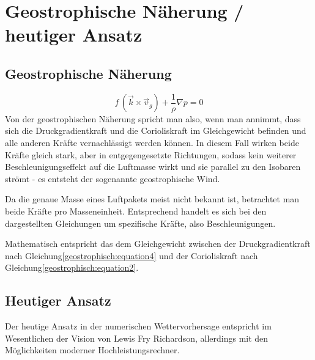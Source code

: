 %
%
%
%
\section{Geostrophische Näherung / heutiger Ansatz
\label{geostrophisch:section:geoNäherung}}
\subsection{Geostrophische Näherung}
\begin{equation}
f\, (\vec{k} \times \vec{v}_g) 
+
\frac{1}{\rho} \nabla p
=
0
\label{geostrophisch:equation5}
\end{equation}
Von der geostrophischen Näherung spricht man also, wenn man annimmt, dass sich die Druckgradientkraft und die Corioliskraft im Gleichgewicht befinden und alle anderen Kräfte vernachlässigt werden können. In diesem Fall wirken beide Kräfte gleich stark, aber in entgegengesetzte Richtungen, sodass kein weiterer Beschleunigungseffekt auf die Luftmasse wirkt und sie parallel zu den Isobaren strömt - es entsteht der sogenannte geostrophische Wind.

\vspace{1em}

Da die genaue Masse eines Luftpakets meist nicht bekannt ist, betrachtet man beide Kräfte pro Masseneinheit. Entsprechend handelt es sich bei den dargestellten Gleichungen um spezifische Kräfte, also Beschleunigungen.

\vspace{1em}

Mathematisch entspricht das dem Gleichgewicht zwischen der Druckgradientkraft nach Gleichung\eqref{geostrophisch:equation4} und der Corioliskraft nach Gleichung\eqref{geostrophisch:equation2}.

\subsection{Heutiger Ansatz}

Der heutige Ansatz in der numerischen Wettervorhersage entspricht im Wesentlichen der Vision von Lewis Fry Richardson, allerdings mit den Möglichkeiten moderner Hochleistungsrechner.

